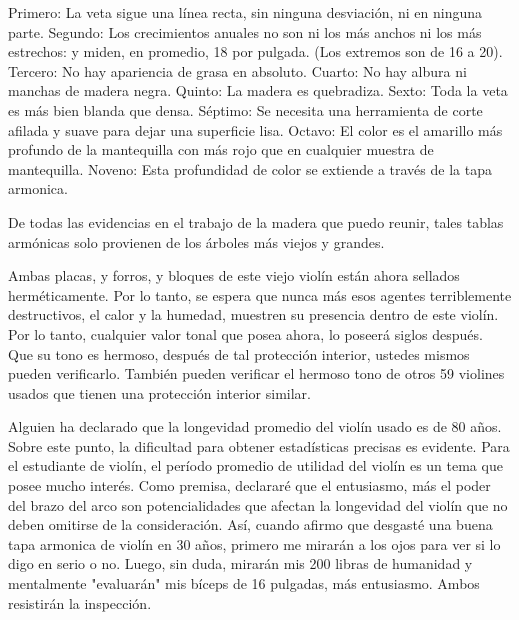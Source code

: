 \documentclass[12pt]{book}
\begin{document}
Primero: La veta sigue una línea recta, sin ninguna desviación, ni en ninguna parte. Segundo: Los crecimientos anuales no son ni los más anchos ni los más estrechos: y miden, en promedio, 18 por pulgada. (Los extremos son de 16 a 20). Tercero: No hay apariencia de grasa en absoluto. Cuarto: No hay albura ni manchas de madera negra. Quinto: La madera es quebradiza. Sexto: Toda la veta es más bien blanda que densa. Séptimo: Se necesita una herramienta de corte afilada y suave para dejar una superficie lisa. Octavo: El color es el amarillo más profundo de la mantequilla con más rojo que en cualquier muestra de mantequilla. Noveno: Esta profundidad de color se extiende a través de la tapa armonica.

De todas las evidencias en el trabajo de la madera que puedo reunir, tales tablas armónicas solo provienen de los árboles más viejos y grandes.

Ambas placas, y forros, y bloques de este viejo violín están ahora sellados herméticamente. Por lo tanto, se espera que nunca más esos agentes terriblemente destructivos, el calor y la humedad, muestren su presencia dentro de este violín. Por lo tanto, cualquier valor tonal que posea ahora, lo poseerá siglos después. Que su tono es hermoso, después de tal protección interior, ustedes mismos pueden verificarlo. También pueden verificar el hermoso tono de otros 59 violines usados que tienen una protección interior similar.

Alguien ha declarado que la longevidad promedio del violín usado es de 80 años. Sobre este punto, la dificultad para obtener estadísticas precisas es evidente. Para el estudiante de violín, el período promedio de utilidad del violín es un tema que posee mucho interés. Como premisa, declararé que el entusiasmo, más el poder del brazo del arco son potencialidades que afectan la longevidad del violín que no deben omitirse de la consideración. Así, cuando afirmo que desgasté una buena tapa armonica de violín en 30 años, primero me mirarán a los ojos para ver si lo digo en serio o no. Luego, sin duda, mirarán mis 200 libras de humanidad y mentalmente "evaluarán" mis bíceps de 16 pulgadas, más entusiasmo. Ambos resistirán la inspección.
\end{document}

